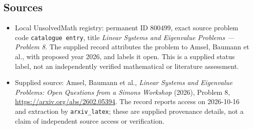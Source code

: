 \documentclass[11pt]{article}
\begin{document}
\subsection{Sources}
\begin{itemize}
\item Local UnsolvedMath registry: permanent ID \(800499\), exact source problem code \texttt{catalogue entry}, title \emph{Linear Systems and Eigenvalue Problems --- Problem 8}. The supplied record attributes the problem to Amsel, Baumann et al., with proposed year 2026, and labels it open. This is a supplied status label, not an independently verified mathematical or literature assessment.
\item Supplied source: Amsel, Baumann et al., \emph{Linear Systems and Eigenvalue Problems: Open Questions from a Simons Workshop} (2026), Problem 8, \url{https://arxiv.org/abs/2602.05394}. The record reports access on 2026-10-16 and extraction by \texttt{arxiv\_latex}; these are supplied provenance details, not a claim of independent source access or verification.
\end{itemize}
\end{document}
